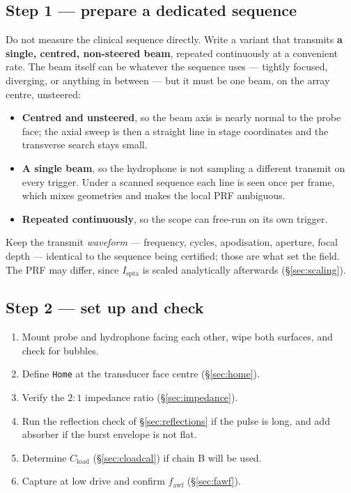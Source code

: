 \documentclass[11pt,a4paper]{article}
\begin{document}
\subsection{Step 1 --- prepare a dedicated sequence}
Do not measure the clinical sequence directly. Write a variant that transmits \textbf{a single,
centred, non-steered beam}, repeated continuously at a convenient rate. The beam itself can be
whatever the sequence uses --- tightly focused, diverging, or anything in between --- but it must be
one beam, on the array centre, unsteered:
\begin{itemize}
  \item \textbf{Centred and unsteered}, so the beam axis is nearly normal to the probe face; the
    axial sweep is then a straight line in stage coordinates and the transverse search stays small.
  \item \textbf{A single beam}, so the hydrophone is not sampling a different transmit on every
    trigger. Under a scanned sequence each line is seen once per frame, which mixes geometries and
    makes the local PRF ambiguous.
  \item \textbf{Repeated continuously}, so the scope can free-run on its own trigger.
\end{itemize}
Keep the transmit \emph{waveform} --- frequency, cycles, apodisation, aperture, focal depth ---
identical to the sequence being certified; those are what set the field. The PRF may differ, since
$I_\mathrm{spta}$ is scaled analytically afterwards (\S\ref{sec:scaling}).

\subsection{Step 2 --- set up and check}
\begin{enumerate}
  \item Mount probe and hydrophone facing each other, wipe both surfaces, and check for bubbles.
  \item Define \texttt{Home} at the transducer face centre (\S\ref{sec:home}).
  \item Verify the $2:1$ impedance ratio (\S\ref{sec:impedance}).
  \item Run the reflection check of \S\ref{sec:reflections} if the pulse is long, and add absorber if
    the burst envelope is not flat.
  \item Determine $C_\mathrm{load}$ (\S\ref{sec:cloadcal}) if chain B will be used.
  \item Capture at low drive and confirm $f_\mathrm{awf}$ (\S\ref{sec:fawf}).
\end{enumerate}
\end{document}
